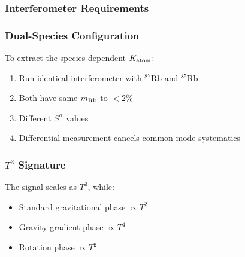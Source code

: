\subsubsection{Interferometer Requirements}

\begin{table}[h!]
\centering
\caption{Matter-wave interferometer specifications for \DFD test.}
\label{tab:mw_specs}
\end{table}

\subsubsection{Dual-Species Configuration}

To extract the species-dependent $K_{\rm atom}$:
\begin{enumerate}
\item Run identical interferometer with $^{87}$Rb and $^{85}$Rb
\item Both have same $m_{\rm Rb}$ to $< 2\%$
\item Different $S^\alpha$ values
\item Differential measurement cancels common-mode systematics
\end{enumerate}

\subsubsection{$T^3$ Signature}

The \DFD signal scales as $T^3$, while:
\begin{itemize}
\item Standard gravitational phase $\propto T^2$
\item Gravity gradient phase $\propto T^4$
\item Rotation phase $\propto T^2$
\end{itemize}

